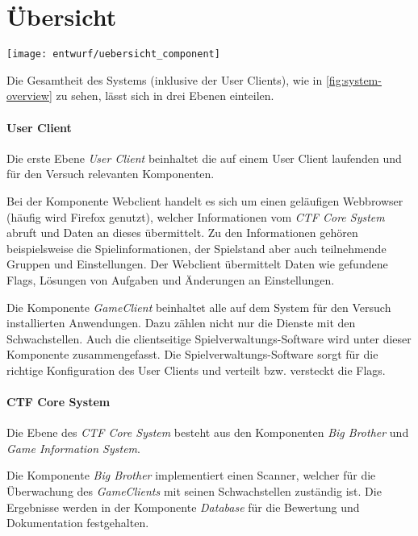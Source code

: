 \section{Übersicht} \label{sec:Übersicht}
\begin{center}
	\texttt{[image: entwurf/uebersicht\_component]}
	\label{fig:system-overview}
\end{center}

Die Gesamtheit des Systems (inklusive der User Clients), wie in \autoref{fig:system-overview} zu sehen, lässt sich in drei Ebenen einteilen.

\paragraph{User Client}
Die erste Ebene \textit{User Client} beinhaltet die auf einem User Client laufenden und für den Versuch relevanten Komponenten.

Bei der Komponente Webclient handelt es sich um einen geläufigen Webbrowser (häufig wird Firefox genutzt), welcher Informationen vom \textit{CTF Core System} abruft und Daten an dieses übermittelt.
Zu den Informationen gehören beispielsweise die Spielinformationen, der Spielstand aber auch teilnehmende Gruppen und Einstellungen. Der Webclient übermittelt Daten wie gefundene Flags, Lösungen von Aufgaben und Änderungen an Einstellungen.

Die Komponente \textit{GameClient} beinhaltet alle auf dem System für den Versuch installierten Anwendungen. Dazu zählen nicht nur die Dienste mit den Schwachstellen. Auch die clientseitige Spielverwaltungs-Software wird unter dieser Komponente zusammengefasst. Die Spielverwaltungs-Software sorgt für die richtige Konfiguration des User Clients und verteilt bzw. versteckt die Flags.

\paragraph{CTF Core System}
Die Ebene des \textit{CTF Core System} besteht aus den Komponenten \textit{Big Brother} und \textit{Game Information System}. 

Die Komponente \textit{Big Brother} implementiert einen Scanner, welcher für die Überwachung des \textit{GameClients} mit seinen Schwachstellen zuständig ist. Die Ergebnisse werden in der Komponente \textit{Database} für die Bewertung und Dokumentation festgehalten.

